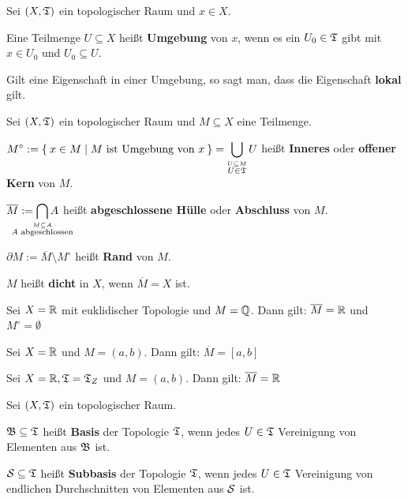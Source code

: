 \begin{definition}%
    Sei $(X, \mathfrak{T})$ ein topologischer Raum und $x \in X$.

    Eine Teilmenge $U \subseteq X$ heißt \textbf{Umgebung} von $x$,
    wenn es ein $U_0 \in \mathfrak{T}$ gibt mit $x \in U_0$ und $U_0 \subseteq U$.

    Gilt eine Eigenschaft in einer Umgebung, so sagt man, dass die Eigenschaft
    \textbf{lokal} gilt.
\end{definition}

\begin{definition}%
    Sei $(X, \mathfrak{T})$ ein topologischer Raum und $M \subseteq X$ eine Teilmenge.
    \begin{defenum}
        \item $\displaystyle M^\circ := \Set{x \in M | M \text{ ist Umgebung von } x} = \bigcup_{\overset{U \subseteq M} {U \in \mathfrak{T}}} U $ heißt \textbf{Inneres} oder \textbf{ offener Kern} von $M$.  
        \item $\displaystyle \overline{M} := \bigcap_{\mathclap{\overset{M \subseteq A}{A \text{ abgeschlossen}}}} A$ heißt \textbf{abgeschlossene Hülle} oder \textbf{Abschluss} von $M$. 
        \item $\partial M := \overline{M} \setminus M^\circ$ heißt \textbf{Rand} von $M$. 
        \item $M$ heißt \textbf{dicht} in $X$, wenn $\overline{M} = X$ ist. 
    \end{defenum}
\end{definition}

\begin{beispiel}
    \begin{bspenum}
        \item Sei $X = \mathbb{R}$ mit euklidischer Topologie und 
              $M = \mathbb{Q}$. Dann gilt: $\overline{M} = \mathbb{R}$ und 
              $M^\circ = \emptyset$
        \item Sei $X = \mathbb{R}$ und $M=(a,b)$. Dann gilt: 
              $\overline{M} = [a,b]$
        \item Sei $X = \mathbb{R}, \mathfrak{T} = \mathfrak{T}_Z$ und $M = (a,b)$. Dann gilt:
              $\overline{M} = \mathbb{R}$
    \end{bspenum}
\end{beispiel}

\begin{definition}%
    Sei $(X, \mathfrak{T})$ ein topologischer Raum.
    \begin{defenum}
        \item $\mathfrak{B} \subseteq \mathfrak{T}$ heißt \textbf{Basis} der Topologie $\mathfrak{T}$,
              wenn jedes $U \in \mathfrak{T}$ Vereinigung von Elementen aus $\mathfrak{B}$
              ist.
        \item $\mathcal{S} \subseteq \mathfrak{T}$ heißt \textbf{Subbasis} der Topologie $\mathfrak{T}$, wenn jedes
              $U \in \mathfrak{T}$ Vereinigung von endlichen Durchschnitten
              von Elementen aus $\mathcal{S}$ ist.
    \end{defenum}
\end{definition}

